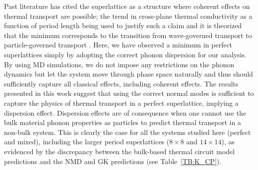 
Past literature has cited the superlattice as a structure where coherent effects on thermal transport are possible; the trend in cross-plane thermal conductivity as a function of period length being used to justify such a claim \cite{PhysRevB.67.195311,PhysRevB.72.174302,PhysRevB.61.3091} and it is theorized that the minimum corresponds to the transition from wave-governed transport to particle-governed transport \cite{PhysRevLett.84.927,PhysRevB.56.10754}. Here, we have observed a minimum in perfect superlattices simply by adopting the correct phonon dispersion for our analysis. By using MD simulations, we do not impose any restrictions on the phonon dynamics but let the system move through phase space naturally and thus should sufficiently capture all classical effects, including coherent effects. The results presented in this work suggest that using the correct normal modes is sufficient to capture the physics of thermal transport in a perfect superlattice, implying a dispersion effect. Dispersion effects are of consequence when one cannot use the bulk material phonon properties as particles to predict thermal transport in a non-bulk system. This is clearly the case for all the systems studied here (perfect and mixed), including the larger period superlattices ($8 \times 8$ and $14 \times 14$), as evidenced by the discrepancy between the bulk-based thermal circuit model predictions and the NMD and GK predictions (see Table~\ref{TB:K_CP}).

